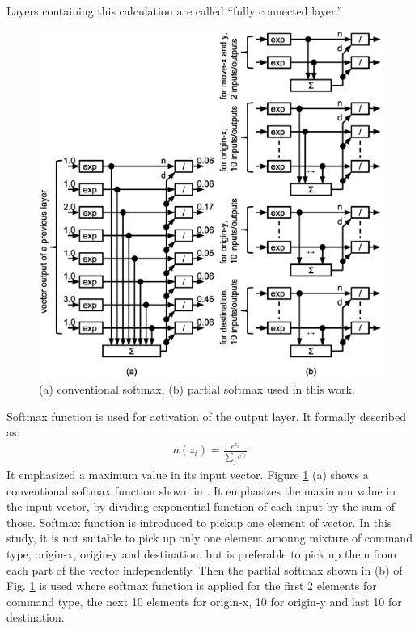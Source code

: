 \documentclass[twocolumn]{article}
\begin{document}
Layers containing this calculation are called ``fully connected layer.''
\begin{figure}[!tp]
 \begin{center}
  \begin{minipage}{\hsize}
   \includegraphics[width=\hsize]{fig/partial_softmax_05.eps}
   \caption{(a) conventional softmax, (b) partial softmax used in this work.}
   \label{fig:partial_softmax}
  \end{minipage}
 \end{center}
\end{figure}

Softmax function is used for activation of the output layer.
It formally described as:
\begin{eqnarray}
a(z_i) = \frac{e^{z_i}}{\sum_j e^{z_j}}
\end{eqnarray}
It emphasized a maximum value in its input vector.
Figure \ref{fig:partial_softmax} (a) shows a conventional softmax
function shown in \cite{mit}.
It emphasizes the maximum value in the input vector,
by dividing exponential function of each input by the sum of those.
Softmax function is introduced to pickup one element of vector.
In this study, it is not suitable to pick up only one element
amoung mixture of command type, origin-x, origin-y and destination.
but is preferable to pick up them from each part of the vector independently.
Then the partial softmax shown in (b) of Fig. \ref{fig:partial_softmax}
is used where softmax function is applied
for the first 2 elements for command type,
the next 10 elements for origin-x, 10 for origin-y and last 10 for destination.
\end{document}
